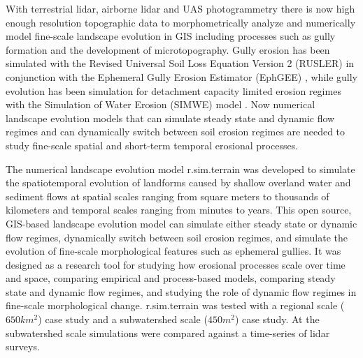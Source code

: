 \documentclass[esurf, manuscript]{copernicus}
\begin{document}
With terrestrial lidar, airborne lidar and 
UAS photogrammetry
there is now high enough resolution topographic data 
to morphometrically analyze and 
numerically model fine-scale landscape evolution in GIS
including processes such as gully formation 
and the development of microtopography. 
Gully erosion has been simulated with 
the Revised Universal Soil Loss Equation Version 2 (RUSLER)
in conjunction with the Ephemeral Gully Erosion Estimator (EphGEE)
\cite{Dabney2014},
while gully evolution
has been simulation for detachment capacity limited erosion regimes
with the Simulation of Water Erosion (SIMWE) model
\cite{Koco2011, Mitasova2013}. 
Now numerical landscape evolution models 
that can simulate 
steady state and dynamic flow regimes
and can dynamically switch between soil erosion regimes 
are needed to study 
fine-scale spatial and short-term temporal erosional processes.

The numerical landscape evolution model 
\lowercase{r.sim.terrain} was developed to 
simulate the spatiotemporal evolution of landforms
caused by shallow overland water and sediment flows
at spatial scales ranging from
square meters to thousands of kilometers
and temporal scales ranging from minutes to years. 
This open source, GIS-based landscape evolution model can
simulate either steady state or dynamic flow regimes, 
dynamically switch between soil erosion regimes, and
simulate the evolution of fine-scale morphological features 
such as ephemeral gullies.
It was designed as a research tool for
studying how erosional processes scale over time and space,
comparing empirical and process-based models, 
comparing steady state and dynamic flow regimes, and
studying the role of dynamic flow regimes in fine-scale morphological change. 
\lowercase{r.sim.terrain} was tested with a regional scale ($650 km^{2}$) case study
and a subwatershed scale ($450 m^{2}$) case study. 
At the subwatershed scale simulations were compared against 
a time-series of lidar surveys.
\end{document}
